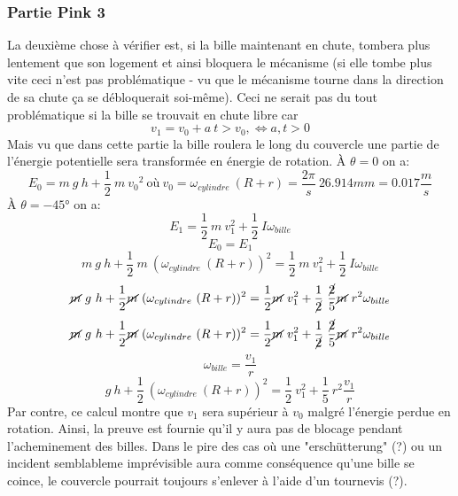 \subsubsection{Partie Pink 3}
La deuxième chose à vérifier est, si la bille maintenant en chute, tombera plus lentement que son logement et ainsi bloquera le mécanisme (si elle tombe plus vite ceci n'est pas problématique - vu que le mécanisme tourne dans la direction de sa chute ça se débloquerait soi-même). Ceci ne serait pas du tout problématique si la bille se trouvait en chute libre car
\[v_{1} = v_{0} + a \ t > v_{0} , \Leftrightarrow a,t > 0\]
Mais vu que dans cette partie la bille roulera le long du couvercle une partie de l'énergie potentielle sera transformée en énergie de rotation.
À $\theta = 0$ on a:
\[E_{0} = m\ g\ h + \frac{1}{2}\ m\ {v_{0}}^{2} \ \text{où} \ v_{0} = \omega_{cylindre}\ (R + r) = \frac{2\pi}{s}\ 26.914mm = 0.017 \frac{m}{s}\]
À $\theta = \ang{-45}$ on a:
\[E_{1} = \frac{1}{2}\ m\ v_{1}^{2} + \frac{1}{2}\ I\omega_{bille}\]
\begin{equation}
E_{0} = E_{1}
\end{equation}
\begin{equation}
m\ g\ h + \frac{1}{2}\ m\ (\omega_{cylindre}\ (R + r))^{2} = \frac{1}{2}\ m\ v_{1}^{2} + \frac{1}{2}\ I\omega_{bille}
\end{equation}
\begin{equation}
\cancel{m}\ g\ h + \frac{1}{2}\cancel{m}\ (\omega_{cylindre}\ (R + r))^{2} = \frac{1}{2}\cancel{m}\ v_{1}^{2} + \frac{1}{\cancel{2}}\ \frac{\cancel{2}}{5}\cancel{m}\ r^{2}\omega_{bille}
\end{equation}
\begin{equation}
\cancel{m}\ g\ h + \frac{1}{2}\cancel{m}\ (\omega_{cylindre}\ (R + r))^{2} = \frac{1}{2}\cancel{m}\ v_{1}^{2} + \frac{1}{\cancel{2}}\ \frac{\cancel{2}}{5}\cancel{m}\ r^{2}\omega_{bille}
\end{equation}
\begin{equation}
\omega_{bille} = \frac{v_{1}}{r}
\end{equation}
\begin{equation}
g\ h + \frac{1}{2}\ (\omega_{cylindre}\ (R + r))^{2} = \frac{1}{2}\ v_{1}^{2} + \frac{1}{5}\ r^{2}\frac{v_{1}}{r}
\end{equation}
Par contre, ce calcul montre que $v_{1}$ sera supérieur à $v_{0}$ malgré l'énergie perdue en rotation. Ainsi, la preuve est fournie qu'il y aura pas de blocage pendant l'acheminement des billes. Dans le pire des cas où une "erschütterung" (?) ou un incident semblableme imprévisible aura comme conséquence qu'une bille se coince, le couvercle pourrait toujours s'enlever à l'aide d'un tournevis (?).
